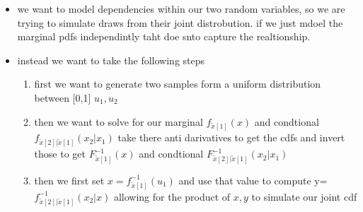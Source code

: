 \documentclass[12pt,twoside]{article}
\begin{document}
\begin{enumerate}
\begin{itemize}
\item we want to model dependencies within our two random variables, so we are trying to simulate draws from their joint distrobution. if we just mdoel the marginal pdfs independintly taht doe snto capture the realtionship. 
\item instead we want to take the following steps
\begin{enumerate}
    \item first we want to generate two samples form a uniform distribution between [0,1] $u_1,u_2$
    \item then we want to solve for our marginal $f_{\tilde{x}[1]}(x)$ and condtional $f_{\tilde{x}[2]|\tilde{x}[1]}(x_2|x_1)$ take there anti darivatives to get the cdfs and invert those to get $F_{\tilde{x}[1]}^{-1}(x)$ and condtional $F_{\tilde{x}[2]|\tilde{x}[1]}^{-1}(x_2|x_1)$
    \item then we first set $x=f_{\tilde{x}[1]}^{-1}(u_1)$ and use that value to compute y=$f_{\tilde{x}[2]|\tilde{x}[1]}^{-1}(x_2|x)$ allowing for the product of $x,y$ to simulate our joint cdf
\end{enumerate}
\end{itemize}



\begin{figure}[h]
\begin{center}
\end{center}
\end{figure}

\end{enumerate}
\end{document}
